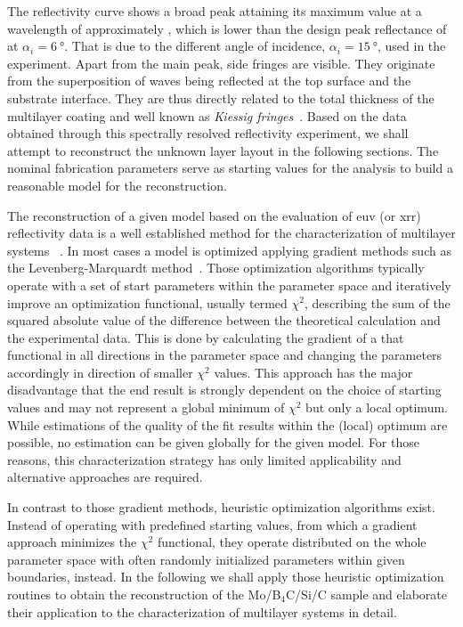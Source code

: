The reflectivity curve shows a broad peak attaining its maximum value at a wavelength of approximately , which is lower than the design peak reflectance of  at $\alpha_i = \SI{6}{\degree}$. That is due to the different angle of incidence, $\alpha_i=\SI{15}{\degree}$, used in the experiment. Apart from the main peak, side fringes are visible. They originate from the superposition of waves being reflected at the top surface and the substrate interface. They are thus directly related to the total thickness of the multilayer coating and well known as \emph{Kiessig fringes}~\cite{kiessig_interferenz_1931}. Based on the data obtained through this spectrally resolved reflectivity experiment, we shall attempt to reconstruct the unknown layer layout in the following sections. The nominal fabrication parameters serve as starting values for the analysis to build a reasonable model for the reconstruction.

The reconstruction of a given model based on the evaluation of \gls{euv} (or \gls{xrr}) reflectivity data is a well established method for the characterization of multilayer systems ~\cite{lim_fabrication_2001, bajt_investigation_2001, braun_mo/si_2002}. In most cases a model is optimized applying gradient methods such as the Levenberg-Marquardt method~\cite{levenberg_method_1944, marquardt_algorithm_1963}. Those optimization algorithms typically operate with a set of start parameters within the parameter space and iteratively improve an optimization functional, usually termed $\chi^2$, describing the sum of the squared absolute value of the difference between the theoretical calculation and the experimental data. This is done by calculating the gradient of a that functional in all directions in the parameter space and changing the parameters accordingly in direction of smaller $\chi^2$ values. This approach has the major disadvantage that the end result is strongly dependent on the choice of starting values and may not represent a global minimum of $\chi^2$ but only a local optimum. While estimations of the quality of the fit results within the (local) optimum are possible, no estimation can be given globally for the given model. For those reasons, this characterization strategy has only limited applicability and alternative approaches are required.

In contrast to those gradient methods, heuristic optimization algorithms exist. Instead of operating with predefined starting values, from which a gradient approach minimizes the $\chi^2$ functional, they operate distributed on the whole parameter space with often randomly initialized parameters within given boundaries, instead. In the following we shall apply those heuristic optimization routines to obtain the reconstruction of the Mo/B$_4$C/Si/C sample and elaborate their application to the characterization of multilayer systems in detail.

